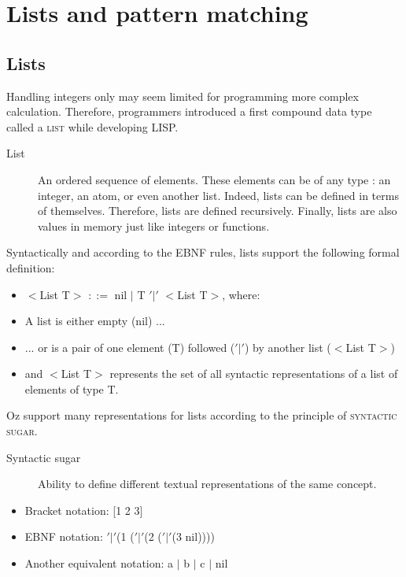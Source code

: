\documentclass[11pt,a4paper,twoside,openright]{report}
\begin{document}
\section{Lists and pattern matching}

\subsection{Lists}

Handling integers only may seem limited for programming more complex 
calculation. Therefore, programmers introduced a first compound data type 
called 
 a \textsc{list} while developing LISP.

\begin{description}
 \item[List] An ordered sequence of elements. These elements can be of any type 
: an integer, an atom, or even another list. Indeed, lists can be defined in 
terms of themselves. Therefore, lists are defined recursively. Finally, lists 
are also values in memory just like integers or functions.
\end{description}

Syntactically and according to the EBNF rules, lists support the following 
formal definition: 
\begin{itemize}
	\item $<$List T$>$ $::=$ nil $|$ T $'|'$ $<$List T$>$, where:
	\item A list is either empty (nil) ...
	\item ... or is a pair of one element (T) followed ($'|'$) by another 
list ($<$List T$>$)
	\item and $<$List T$>$ represents the set of all syntactic 
representations of a list of elements of type T.
\end{itemize}

Oz support many representations for lists according to the principle of 
\textsc{syntactic sugar}.

\begin{description}
 \item[Syntactic sugar] Ability to define different textual representations of 
the same concept.
\end{description}

\begin{itemize}
	\item Bracket notation: [1 2 3]
	\item EBNF notation:  $'|'$(1  ($'|'$(2 ($'|'$(3 nil))))
	\item Another equivalent notation: a $|$ b $|$ c $|$ nil
\end{itemize}
\end{document}

